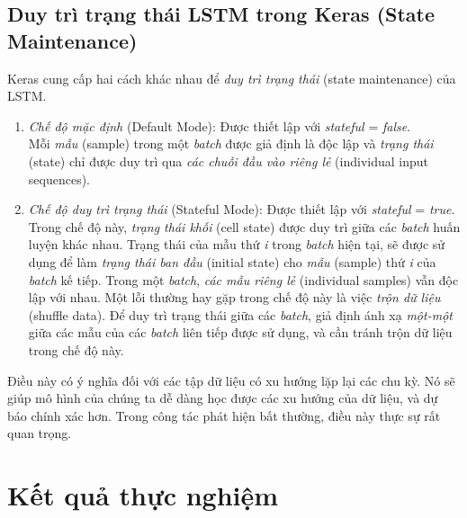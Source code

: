 \subsection{Duy trì trạng thái LSTM trong Keras (State Maintenance)}
Keras cung cấp hai cách khác nhau để \textit{duy trì trạng thái} (state maintenance) của LSTM.
\begin{enumerate}
\item \textit{Chế độ mặc định} (Default Mode): Được thiết lập với \textit{stateful} = \textit{false}.\\
Mỗi \textit{mẫu} (sample) trong một \textit{batch} được giả định là độc lập và \textit{trạng thái} (state) chỉ được duy trì qua \textit{các chuỗi đầu vào riêng lẻ} (individual input sequences).
\item \textit{Chế độ duy trì trạng thái} (Stateful Mode): Được thiết lập với \textit{stateful} = \textit{true}.\\
Trong chế độ này, \textit{trạng thái khối} (cell state) được duy trì giữa các \textit{batch} huấn luyện khác nhau. Trạng thái của mẫu thứ \textit{i} trong \textit{batch} hiện tại, sẽ được sử dụng để làm \textit{trạng thái ban đầu} (initial state) cho \textit{mẫu} (sample) thứ \textit{i} của \textit{batch} kế tiếp. Trong một \textit{batch}, \textit{các mẫu riêng lẻ} (individual samples) vẫn độc lập với nhau. Một lỗi thường hay gặp trong chế độ này là việc \textit{trộn dữ liệu} (shuffle data). Để duy trì trạng thái giữa các \textit{batch}, giả định ánh xạ \textit{một-một} giữa các mẫu của các \textit{batch} liên tiếp được sử dụng, và cần tránh trộn dữ liệu trong chế độ này.
\end{enumerate}

Điều này có ý nghĩa đối với các tập dữ liệu có xu hướng lặp lại các chu kỳ. Nó sẽ giúp mô hình của chúng ta dễ dàng học được các xu hướng của dữ liệu, và dự báo chính xác hơn. Trong công tác phát hiện bất thường, điều này thực sự rất quan trọng. 

\section{Kết quả thực nghiệm}
